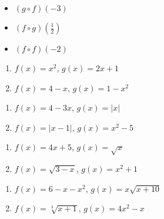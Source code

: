 \begin{multicols}{3}

\begin{itemize}

\item  $(g\circ f)(-3)$

\item  $(f\circ g)\left(\frac{1}{2}\right)$

\item  $(f \circ f)(-2)$

\end{itemize}

\end{multicols}

\begin{multicols}{2}
\begin{enumerate}

\item  $f(x) = x^2$, $g(x) = 2x+1$ \label{funccompeval1first}
\item  $f(x) = 4-x$, $g(x) = 1-x^2$

\setcounter{HW}{\value{enumi}}
\end{enumerate}
\end{multicols}

\begin{multicols}{2}
\begin{enumerate}
\setcounter{enumi}{\value{HW}}

\item  $f(x) = 4-3x$, $g(x) = |x|$
\item  $f(x) = |x-1|$, $g(x) = x^2-5$

\setcounter{HW}{\value{enumi}}
\end{enumerate}
\end{multicols}

\begin{multicols}{2}
\begin{enumerate}
\setcounter{enumi}{\value{HW}}

\item  $f(x) = 4x+5$, $g(x) = \sqrt{x}$
\item  $f(x) = \sqrt{3-x}$, $g(x) = x^2+1$

\setcounter{HW}{\value{enumi}}
\end{enumerate}
\end{multicols}

\begin{multicols}{2}
\begin{enumerate}
\setcounter{enumi}{\value{HW}}

\item  $f(x) = 6-x-x^2$, $g(x) = x\sqrt{x+10}$
\item  $f(x) = \sqrt[3]{x+1}$, $g(x) = 4x^2-x$

\setcounter{HW}{\value{enumi}}
\end{enumerate}
\end{multicols}

